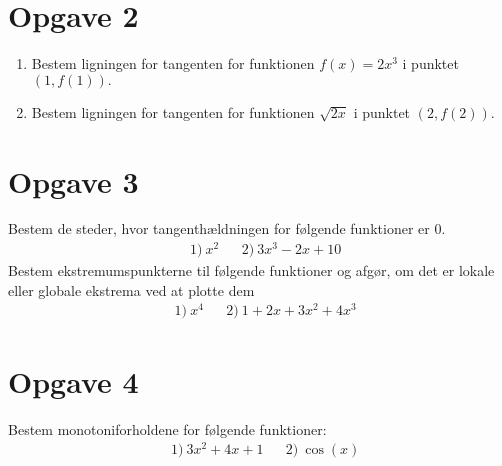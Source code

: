 \section*{Opgave 2}
\begin{enumerate}[label=\roman*)]
\item Bestem ligningen for tangenten for funktionen $f(x)=2x^3$ i punktet $(1,f(1)).$
\item Bestem ligningen for tangenten for funktionen $\sqrt{2x}$ i punktet $(2,f(2)).$
\end{enumerate}
\section*{Opgave 3}
Bestem de steder, hvor tangenthældningen for følgende funktioner er $0$. 
\begin{align*}
&1) \ x^2  &&2) \ 3x^3-2x+10    
\end{align*}
Bestem ekstremumspunkterne til følgende funktioner og afgør, om det er lokale eller globale ekstrema ved at plotte dem
\begin{align*}
&1)\ x^{4} && 2)\ 1+2x+3x^2+4x^3 
\end{align*}
\section*{Opgave 4}
Bestem monotoniforholdene for følgende funktioner:
\begin{align*}
&1) \ 3x^2+4x+1 &&2)\ \cos(x)
\end{align*}